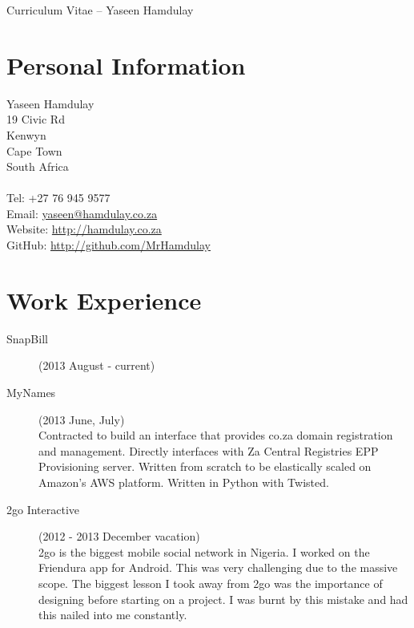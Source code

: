 \documentclass[margin,line,a4paper]{resume}
\begin{document}
    {\sc \Large Curriculum Vitae -- Yaseen Hamdulay}
    \begin{resume}
        \vspace{0.5cm}

        \section{\mysidestyle Personal Information}
            Yaseen Hamdulay\\
            19 Civic Rd\\ %
            Kenwyn\\
            Cape Town\\
            South Africa\\
            \\
            Tel: +27 76 945 9577\\
            Email: \href{mailto:yaseen@hamdulay.co.za}{yaseen@hamdulay.co.za}\\
            Website: \href{http://hamdulay.co.za}{http://hamdulay.co.za}\\
            GitHub: \href{http://github.com/MrHamdulay}{http://github.com/MrHamdulay}\\

        \section{\mysidestyle Work Experience}
            \begin{description}
                \item[SnapBill] (2013 August - current) \\

                \item[MyNames] (2013 June, July) \\
                    Contracted to build an interface that provides co.za domain registration and management. 
                    Directly interfaces with Za Central Registries EPP Provisioning server. Written from scratch
                    to be elastically scaled on Amazon's AWS platform. Written in Python with Twisted.

                \item[2go Interactive] (2012 - 2013 December vacation) \\
                    2go is the biggest mobile social network in Nigeria. I worked on the Friendura app for Android. 
                    This was very challenging due to the massive scope. The biggest lesson I took away from 
                    2go was the importance of designing before starting on a project. I was burnt by this 
                    mistake and had this nailed into me constantly.


\end{description}
\end{resume}
\end{document}
